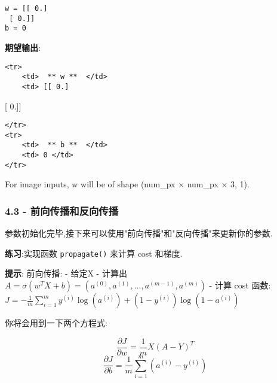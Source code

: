 \documentclass[11pt]{article}
\begin{document}
    \begin{Verbatim}[commandchars=\\\{\}]
w = [[ 0.]
 [ 0.]]
b = 0

    \end{Verbatim}

    \textbf{期望输出}:

\begin{verbatim}
<tr>
    <td>  ** w **  </td>
    <td> [[ 0.]
\end{verbatim}

{[} 0.{]}{]}

\begin{verbatim}
</tr>
<tr>
    <td>  ** b **  </td>
    <td> 0 </td>
</tr>
\end{verbatim}

For image inputs, w will be of shape (num\_px \(\times\) num\_px
\(\times\) 3, 1).

    \subsubsection{4.3 -
前向传播和反向传播}\label{ux524dux5411ux4f20ux64adux548cux53cdux5411ux4f20ux64ad}

参数初始化完毕,接下来可以使用"前向传播"和"反向传播"来更新你的参数.

\textbf{练习}:实现函数 \texttt{propagate()} 来计算 cost 和梯度.

\textbf{提示}: 前向传播: - 给定X - 计算出
\(A = \sigma (w^T X+ b)=(a^{(0)}, a^{(1)},..., a^{(m-1)}, a^{(m)})\) -
计算 cost 函数:
\(J = -\frac{1}{m}\sum_{i=1}^{m}y^{(i)}\log(a^{(i)})+(1-y^{(i)})\log(1-a^{(i)})\)

你将会用到一下两个方程式:

\[ \frac{\partial J}{\partial w} = \frac{1}{m}X(A-Y)^T\tag{7}\]
\[ \frac{\partial J}{\partial b} = \frac{1}{m} \sum_{i=1}^m (a^{(i)}-y^{(i)})\tag{8}\]
\end{document}
